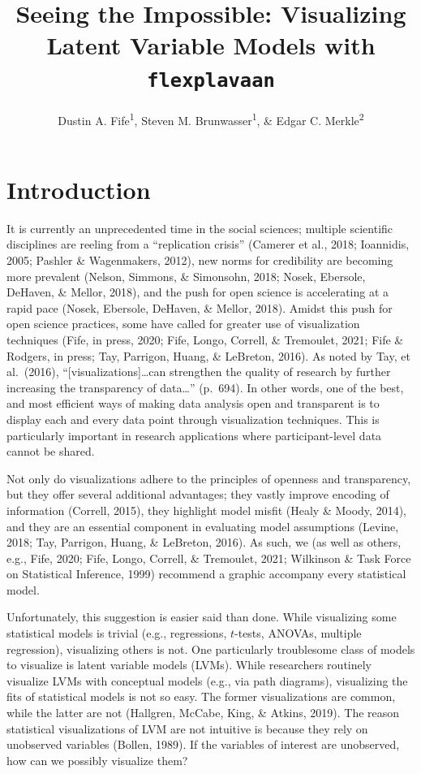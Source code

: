 \documentclass[
  english,
  man]{apa6}
\title{Seeing the Impossible: Visualizing Latent Variable Models with \texttt{flexplavaan}}
\author{Dustin A. Fife\textsuperscript{1}, Steven M. Brunwasser\textsuperscript{1}, \& Edgar C. Merkle\textsuperscript{2}}
\date{}
\affiliation{\vspace{0.5cm}\textsuperscript{1} Rowan University\\\textsuperscript{2} University of Missouri}
\begin{document}
\maketitle

\hypertarget{introduction}{%
\section{Introduction}\label{introduction}}

It is currently an unprecedented time in the social sciences; multiple scientific disciplines are reeling from a ``replication crisis'' (Camerer et al., 2018; Ioannidis, 2005; Pashler \& Wagenmakers, 2012), new norms for credibility are becoming more prevalent (Nelson, Simmons, \& Simonsohn, 2018; Nosek, Ebersole, DeHaven, \& Mellor, 2018), and the push for open science is accelerating at a rapid pace (Nosek, Ebersole, DeHaven, \& Mellor, 2018). Amidst this push for open science practices, some have called for greater use of visualization techniques (Fife, in press, 2020; Fife, Longo, Correll, \& Tremoulet, 2021; Fife \& Rodgers, in press; Tay, Parrigon, Huang, \& LeBreton, 2016). As noted by Tay, et al.~(2016), ``{[}visualizations{]}\ldots can strengthen the quality of research by further increasing the transparency of data\ldots{}'' (p.~694). In other words, one of the best, and most efficient ways of making data analysis open and transparent is to display each and every data point through visualization techniques. This is particularly important in research applications where participant-level data cannot be shared.

Not only do visualizations adhere to the principles of openness and transparency, but they offer several additional advantages; they vastly improve encoding of information (Correll, 2015), they highlight model misfit (Healy \& Moody, 2014), and they are an essential component in evaluating model assumptions (Levine, 2018; Tay, Parrigon, Huang, \& LeBreton, 2016). As such, we (as well as others, e.g., Fife, 2020; Fife, Longo, Correll, \& Tremoulet, 2021; Wilkinson \& Task Force on Statistical Inference, 1999) recommend a graphic accompany every statistical model.

Unfortunately, this suggestion is easier said than done. While visualizing some statistical models is trivial (e.g., regressions, \(t\)-tests, ANOVAs, multiple regression), visualizing others is not. One particularly troublesome class of models to visualize is latent variable models (LVMs). While researchers routinely visualize LVMs with conceptual models (e.g., via path diagrams), visualizing the fits of statistical models is not so easy. The former visualizations are common, while the latter are not (Hallgren, McCabe, King, \& Atkins, 2019). The reason statistical visualizations of LVM are not intuitive is because they rely on unobserved variables (Bollen, 1989). If the variables of interest are unobserved, how can we possibly visualize them?
\end{document}
